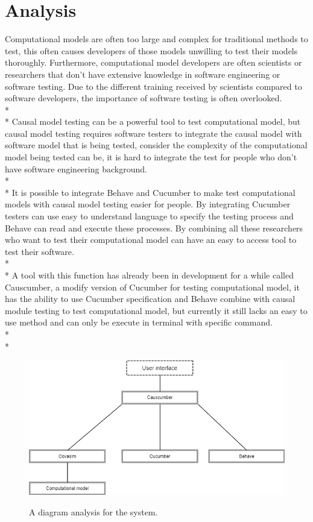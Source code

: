 \chapter{Analysis}
Computational models are often too large and complex for traditional methods to test, this often causes developers of those models unwilling to test their models thoroughly. Furthermore, computational model developers are often scientists or researchers that don’t have extensive knowledge in software engineering or software testing. Due to the different training received by scientists compared to software developers, the importance of software testing is often overlooked.  \\*\\*
Causal model testing can be a powerful tool to test computational model, but causal model testing requires software testers to integrate the causal model with software model that is being tested, consider the complexity of the computational model being tested can be, it is hard to integrate the test for people who don’t have software engineering background. \\*\\*
It is possible to integrate Behave and Cucumber to make test computational models with causal model testing easier for people. By integrating Cucumber testers can use easy to understand language to specify the testing process and Behave can read and execute these processes. By combining all these researchers who want to test their computational model can have an easy to access tool to test their software. \\*\\*
A tool with this function has already been in development for a while called Causcumber, a modify version of Cucumber for testing computational model, it has the ability to use Cucumber specification and Behave combine with causal module testing to test computational model, but currently it still lacks an easy to use method and can only be execute in terminal with specific command. \\*\\*

\begin{figure}[h]
	\centering
	\includegraphics[width=13cm]{figures/Analysis.png}\\
	\caption{A diagram analysis for the system.}
	\label{fig:figure2}
\end{figure}

